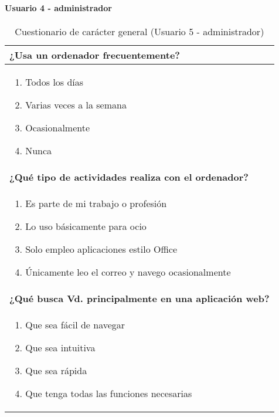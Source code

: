 \paragraph*{Usuario 4 - administrador}
\begin{table}[H]
\centering
\caption{Cuestionario de carácter general (Usuario 5 - administrador)}
\begin{tabular}{p{36em}}
\toprule
\rowcolor[rgb]{ .949,  .949,  .949} \textbf{¿Usa un ordenador frecuentemente?} \\ \midrule
\vspace{-4mm}
\begin{enumerate}
\item \colorbox{blue!30}{Todos los días}
\item Varias veces a la semana
\item Ocasionalmente
\item Nunca
\end{enumerate} \\ \midrule
\rowcolor[rgb]{ .949,  .949,  .949} \textbf{¿Qué tipo de actividades realiza con el ordenador?} \\ \midrule
\vspace{-4mm}
\begin{enumerate}
\item \colorbox{blue!30}{Es parte de mi trabajo o profesión}
\item Lo uso básicamente para ocio
\item Solo empleo aplicaciones estilo Office
\item Únicamente leo el correo y navego ocasionalmente
\end{enumerate} \\ \midrule
\rowcolor[rgb]{ .949,  .949,  .949} \textbf{¿Qué busca Vd. principalmente en una aplicación web?} \\ \midrule
\vspace{-4mm}
\begin{enumerate}
\item Que sea fácil de navegar
\item Que sea intuitiva
\item Que sea rápida
\item \colorbox{blue!30}{Que tenga todas las funciones necesarias}
\end{enumerate} \\ \bottomrule
\end{tabular}
\end{table}

